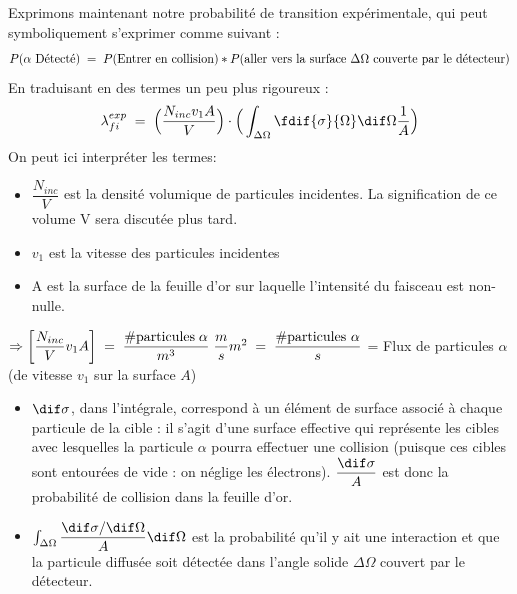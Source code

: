 Exprimons maintenant notre probabilité de transition expérimentale, qui peut symboliquement s'exprimer comme suivant :
\begin{equation*}
    P(\alpha\text{ Détecté}) \; = \; P(\text{Entrer en collision}) * P(\text{aller vers la surface } \Delta \Omega \text{ couverte par le détecteur})
\end{equation*}
En traduisant en des termes un peu plus rigoureux :
\begin{equation}
    \lambda_{fi}^{exp} \eq
    \Big(   \dfrac{N_{inc} v_1 A}{V}   \Big) \cdot
    \Big(
    \int_{\Delta \Omega} \fdif{\sigma}{\Omega} \dif\Omega \dfrac{1}{A}
    \Big)
    \label{lambda_exp}
\end{equation}
On peut ici interpréter les termes:
\begin{itemize}[label=$\bullet$]
    \item $\dfrac{N_{inc}}{V}$ est la densité volumique de particules incidentes. La signification de ce volume V sera discutée plus tard.
    \item $v_1$ est la vitesse des particules incidentes
    \item A est la surface de la feuille d'or sur laquelle l'intensité du faisceau est non-nulle.\\
\end{itemize}

    $\Rightarrow \left[\dfrac{N_{inc}}{V}v_1A\right] 
    \; = \; 
    \dfrac{\mbox{\#particules}\; \alpha}{m^3}\;\dfrac{m}{s}m^2 
    \; = \; 
    \dfrac{\mbox{\#particules}\ \alpha}{s}$  =  Flux de particules $\alpha$ (de vitesse $v_1$ sur la surface $A$)\\
    
\begin{itemize}[label=$\bullet$]  
    \item $\dif\sigma$, dans l'intégrale, correspond à un élément de surface associé à chaque particule de la cible : il s'agit d'une surface effective qui représente les cibles avec lesquelles la particule $\alpha$ pourra effectuer une collision (puisque ces cibles sont entourées de vide : on néglige les électrons). $\dfrac{\dif\sigma}{A}$ est donc la probabilité de collision dans la feuille d'or.
    
    \item $\int_{\Delta \Omega} \dfrac{\dif\sigma/\dif\Omega}{A}\dif\Omega$ est la probabilité qu'il y ait une interaction et que la particule diffusée soit détectée dans l'angle solide $\Delta \Omega$ couvert par le détecteur.\\
\end{itemize}

